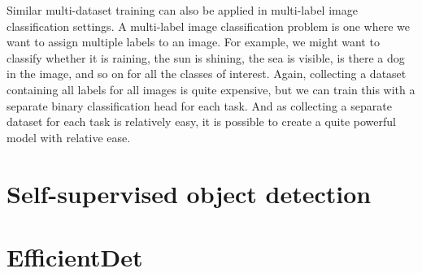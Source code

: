 Similar multi-dataset training can also be applied in multi-label image classification settings.
A multi-label image classification problem is one where we want to assign multiple labels to an image.
For example, we might want to classify whether it is raining, the sun is shining, the sea is visible, is there a dog in the image, and so on for all the classes of interest.
Again, collecting a dataset containing all labels for all images is quite expensive, but we can train this with a separate binary classification head for each task.
And as collecting a separate dataset for each task is relatively easy, it is possible to create a quite powerful model with relative ease.

\section{Self-supervised object detection}


\section{EfficientDet}